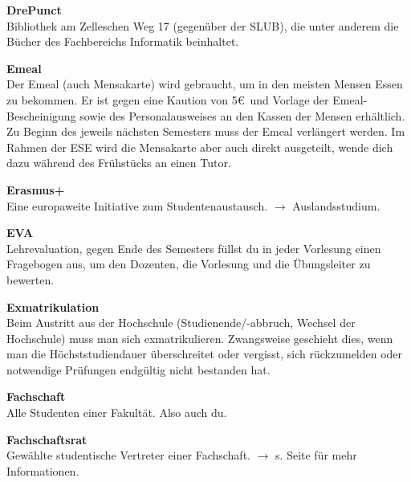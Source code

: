 \begin{multicols}{2}

\textbf{DrePunct} \\
Bibliothek am Zelleschen Weg 17 (gegenüber der SLUB), die unter anderem die Bücher des Fachbereichs Informatik beinhaltet.

\textbf{Emeal} \\
Der Emeal (auch Mensakarte) wird gebraucht, um in den meisten Mensen Essen zu bekommen.
Er ist gegen eine Kaution von 5\euro\ und Vorlage der Emeal-Bescheinigung sowie des Personalausweises an den Kassen der Mensen erhältlich.
Zu Beginn des jeweils nächsten Semesters muss der Emeal verlängert werden.
Im Rahmen der ESE wird die Mensakarte aber auch direkt ausgeteilt, wende dich dazu während des Frühstücks an einen Tutor.

\textbf{Erasmus+} \\
Eine europaweite Initiative zum Studentenaustausch.
$\rightarrow$ Auslandsstudium.

\textbf{EVA} \\
Lehrevaluation, gegen Ende des Semesters füllst du in jeder Vorlesung einen Fragebogen aus, um den Dozenten, die Vorlesung und die Übungsleiter zu bewerten.

\textbf{Exmatrikulation} \\
Beim Austritt aus der Hochschule (Studienende/-abbruch, Wechsel der Hochschule) muss man sich exmatrikulieren.
Zwangsweise geschieht dies, wenn man die Höchststudiendauer überschreitet oder vergisst, sich rückzumelden oder notwendige Prüfungen endgültig nicht bestanden hat.

\textbf{Fachschaft} \\
Alle Studenten einer Fakultät. Also auch du.

\textbf{Fachschaftsrat} \\
Gewählte studentische Vertreter einer Fachschaft. $\rightarrow$ s. Seite \pageref{sec:fachschaftsrat} für mehr Informationen.



\end{multicols}

